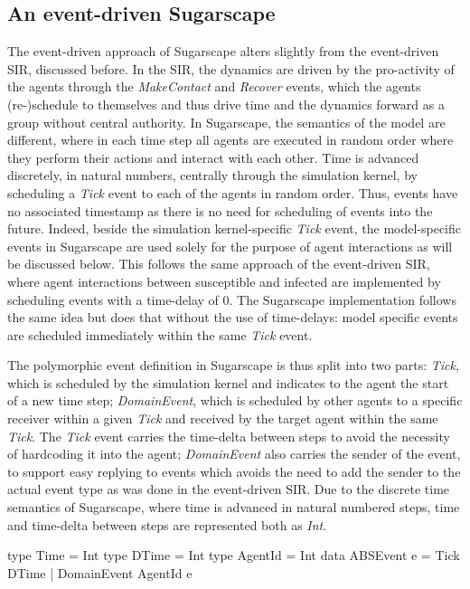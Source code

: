 \subsection{An event-driven Sugarscape}
The event-driven approach of Sugarscape alters slightly from the event-driven SIR, discussed before. In the SIR, the dynamics are driven by the pro-activity of the agents through the \textit{MakeContact} and \textit{Recover} events, which the agents (re-)schedule to themselves and thus drive time and the dynamics forward as a group without central authority. In Sugarscape, the semantics of the model are different, where in each time step all agents are executed in random order where they perform their actions and interact with each other. Time is advanced discretely, in natural numbers, centrally through the simulation kernel, by scheduling a \textit{Tick} event to each of the agents in random order. Thus, events have no associated timestamp as there is no need for scheduling of events into the future. Indeed, beside the simulation kernel-specific \textit{Tick} event, the model-specific events in Sugarscape are used solely for the purpose of agent interactions as will be discussed below. This follows the same approach of the event-driven SIR, where agent interactions between susceptible and infected are implemented by scheduling events with a time-delay of 0. The Sugarscape implementation follows the same idea but does that without the use of time-delays: model specific events are scheduled immediately within the same \textit{Tick} event.

The polymorphic event definition in Sugarscape is thus split into two parts: \textit{Tick}, which is scheduled by the simulation kernel and indicates to the agent the start of a new time step; \textit{DomainEvent}, which is scheduled by other agents to a specific receiver within a given \textit{Tick} and received by the target agent within the same \textit{Tick}. The \textit{Tick} event carries the time-delta between steps to avoid the necessity of hardcoding it into the agent; \textit{DomainEvent} also carries the sender of the event, to support easy replying to events which avoids the need to add the sender to the actual event type as was done in the event-driven SIR. Due to the discrete time semantics of Sugarscape, where time is advanced in natural numbered steps, time and time-delta between steps are represented both as \textit{Int}.

\begin{HaskellCode}
type Time       = Int
type DTime      = Int
type AgentId    = Int
data ABSEvent e = Tick DTime 
                | DomainEvent AgentId e
\end{HaskellCode}

